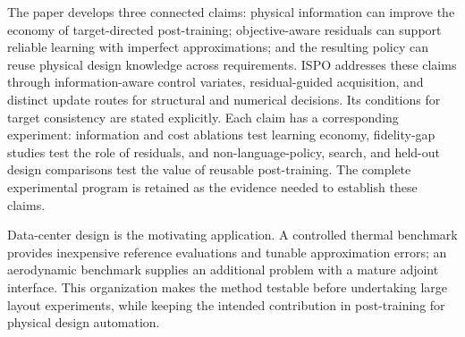 The paper develops three connected claims: physical information can improve the economy of target-directed post-training; objective-aware residuals can support reliable learning with imperfect approximations; and the resulting policy can reuse physical design knowledge across requirements. ISPO addresses these claims through information-aware control variates, residual-guided acquisition, and distinct update routes for structural and numerical decisions. Its conditions for target consistency are stated explicitly. Each claim has a corresponding experiment: information and cost ablations test learning economy, fidelity-gap studies test the role of residuals, and non-language-policy, search, and held-out design comparisons test the value of reusable post-training. The complete experimental program is retained as the evidence needed to establish these claims.

Data-center design is the motivating application. A controlled thermal benchmark provides inexpensive reference evaluations and tunable approximation errors; an aerodynamic benchmark supplies an additional problem with a mature adjoint interface. This organization makes the method testable before undertaking large layout experiments, while keeping the intended contribution in post-training for physical design automation.
